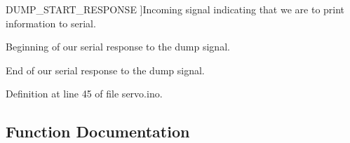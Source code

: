 \begin{Desc}
\begin{description}
{\hypertarget{servo_8ino_a99fb83031ce9923c84392b4e92f956b5a51975080564db9aa29bff29cce328b5f}{}D\+U\+M\+P\+\_\+\+S\+T\+A\+R\+T\+\_\+\+R\+E\+S\+P\+O\+N\+S\+E\label{servo_8ino_a99fb83031ce9923c84392b4e92f956b5a51975080564db9aa29bff29cce328b5f}
}]Incoming signal indicating that we are to print information to serial. \item[{\em 
\hypertarget{servo_8ino_a99fb83031ce9923c84392b4e92f956b5aa7ca295335eb71b345d3b0bd0e53277e}{}D\+U\+M\+P\+\_\+\+E\+N\+D\+\_\+\+R\+E\+S\+P\+O\+N\+S\+E\label{servo_8ino_a99fb83031ce9923c84392b4e92f956b5aa7ca295335eb71b345d3b0bd0e53277e}
}]Beginning of our serial response to the dump signal. \item[{\em 
\hypertarget{servo_8ino_a99fb83031ce9923c84392b4e92f956b5aebe1616f434c26e10f088aebf559d708}{}D\+U\+M\+P\+\_\+\+R\+E\+S\+P\+O\+N\+S\+E\+\_\+\+L\+E\+N\label{servo_8ino_a99fb83031ce9923c84392b4e92f956b5aebe1616f434c26e10f088aebf559d708}
}]End of our serial response to the dump signal. \end{description}
\end{Desc}


Definition at line 45 of file servo.\+ino.



\subsection{Function Documentation}
\hypertarget{servo_8ino_accd2600060dbaee3a3b41aed4034c63c}{}
